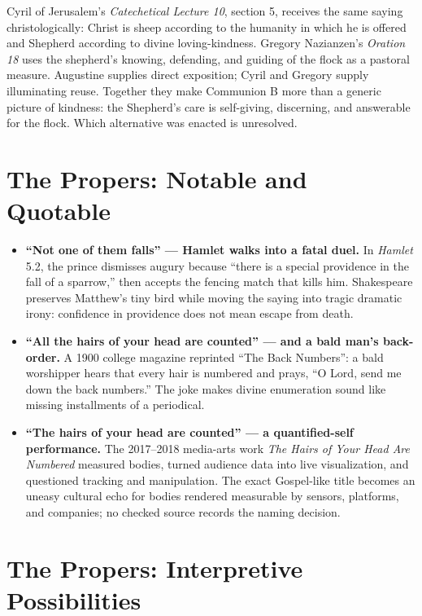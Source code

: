 Cyril of Jerusalem's \emph{Catechetical Lecture 10}, section 5, receives the same saying christologically: Christ is sheep according to the humanity in which he is offered and Shepherd according to divine loving-kindness. Gregory Nazianzen's \emph{Oration 18} uses the shepherd's knowing, defending, and guiding of the flock as a pastoral measure. Augustine supplies direct exposition; Cyril and Gregory supply illuminating reuse. Together they make Communion B more than a generic picture of kindness: the Shepherd's care is self-giving, discerning, and answerable for the flock. Which alternative was enacted is unresolved.

\section*{The Propers: Notable and Quotable}

{\small
\begin{itemize}
\item \textbf{“Not one of them falls” --- Hamlet walks into a fatal duel.\enspace{}} In \emph{Hamlet} 5.2, the prince dismisses augury because “there is a special providence in the fall of a sparrow,” then accepts the fencing match that kills him. Shakespeare preserves Matthew's tiny bird while moving the saying into tragic dramatic irony: confidence in providence does not mean escape from death.

\item \textbf{“All the hairs of your head are counted” --- and a bald man's back-order.\enspace{}} A 1900 college magazine reprinted “The Back Numbers”: a bald worshipper hears that every hair is numbered and prays, “O Lord, send me down the back numbers.” The joke makes divine enumeration sound like missing installments of a periodical.

\item \textbf{“The hairs of your head are counted” --- a quantified-self performance.\enspace{}} The 2017--2018 media-arts work \emph{The Hairs of Your Head Are Numbered} measured bodies, turned audience data into live visualization, and questioned tracking and manipulation. The exact Gospel-like title becomes an uneasy cultural echo for bodies rendered measurable by sensors, platforms, and companies; no checked source records the naming decision.
\end{itemize}
}

\section*{The Propers: Interpretive Possibilities}

